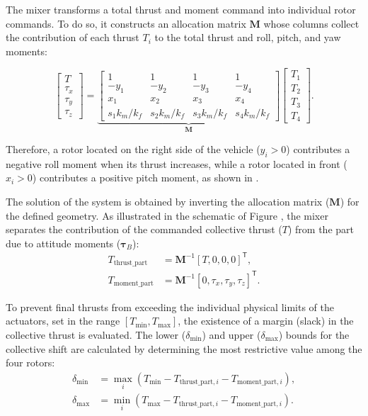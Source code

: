 The mixer transforms a total thrust and moment command into individual rotor commands. To do so, it constructs an allocation matrix $\bm{M}$ whose columns collect the contribution of each thrust $T_i$ to the total thrust and roll, pitch, and yaw moments:

\begin{equation}
\begin{bmatrix}
T\\ \tau_x\\ \tau_y\\ \tau_z
\end{bmatrix}
=
\underbrace{
\begin{bmatrix}
1 & 1 & 1 & 1\\
-y_1 & -y_2 & -y_3 & -y_4\\
x_1 & x_2 & x_3 & x_4\\
s_1 k_m/k_f & s_2 k_m/k_f & s_3 k_m/k_f & s_4 k_m/k_f
\end{bmatrix}
}_{\bm{M}}
\begin{bmatrix}
T_1\\T_2\\T_3\\T_4
\end{bmatrix}.
\label{eq:matriz-mixer}
\end{equation}

Therefore, a rotor located on the right side of the vehicle ($y_i>0$) contributes a negative roll moment when its thrust increases, while a rotor located in front ($x_i>0$) contributes a positive pitch moment, as shown in .

The solution of the system is obtained by inverting the allocation matrix ($\bm{M}$) for the defined geometry. As illustrated in the schematic of Figure , the mixer separates the contribution of the commanded collective thrust ($T$) from the part due to attitude moments ($\bm{\tau}_B$):
\begin{align}
 T_{\text{thrust\_part}} &= \bm{M}^{-1} [T, 0, 0, 0]^\mathsf{T}, \\
 T_{\text{moment\_part}} &= \bm{M}^{-1} [0, \tau_x, \tau_y, \tau_z]^\mathsf{T}.
\end{align}

To prevent final thrusts from exceeding the individual physical limits of the actuators, set in the range $[T_{\min}, T_{\max}]$, the existence of a margin (slack) in the collective thrust is evaluated. The lower ($\delta_{\min}$) and upper ($\delta_{\max}$) bounds for the collective shift are calculated by determining the most restrictive value among the four rotors:
\begin{align}
 \delta_{\min} &= \max_i(T_{\min} - T_{\text{thrust\_part},i} - T_{\text{moment\_part},i}), \\
 \delta_{\max} &= \min_i(T_{\max} - T_{\text{thrust\_part},i} - T_{\text{moment\_part},i}).
\end{align}

